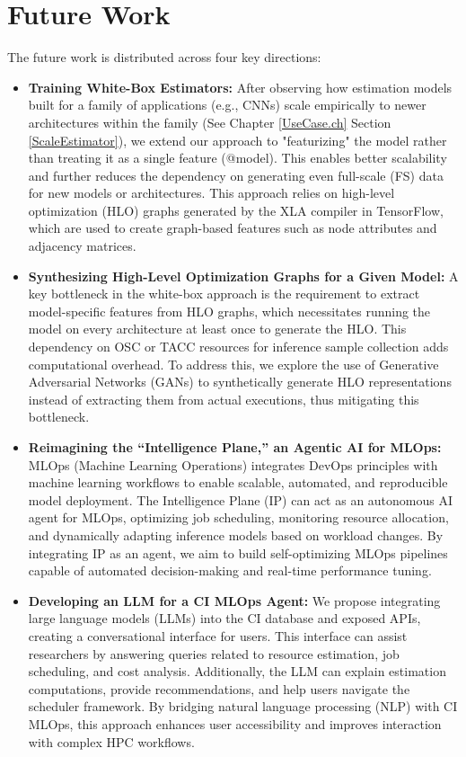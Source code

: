 \chapter{Future Work}
\label{FutureWork.ch}


The future work is distributed across four key directions:

\begin{itemize}
    \item \textbf{Training White-Box Estimators:}  
    After observing how estimation models built for a family of applications (e.g., CNNs) scale empirically to newer architectures within the family (See Chapter \ref{UseCase.ch} Section \ref{ScaleEstimator}), we extend our approach to "featurizing" the model rather than treating it as a single feature (@model). This enables better scalability and further reduces the dependency on generating even full-scale (FS) data for new models or architectures. This approach relies on high-level optimization (HLO) graphs generated by the XLA compiler in TensorFlow, which are used to create graph-based features such as node attributes and adjacency matrices.

    \item \textbf{Synthesizing High-Level Optimization Graphs for a Given Model:}  
    A key bottleneck in the white-box approach is the requirement to extract model-specific features from HLO graphs, which necessitates running the model on every architecture at least once to generate the HLO. This dependency on OSC or TACC resources for inference sample collection adds computational overhead. To address this, we explore the use of Generative Adversarial Networks (GANs) to synthetically generate HLO representations instead of extracting them from actual executions, thus mitigating this bottleneck.

    \item \textbf{Reimagining the “Intelligence Plane,” an Agentic AI for MLOps:}  
    MLOps (Machine Learning Operations) integrates DevOps principles with machine learning workflows to enable scalable, automated, and reproducible model deployment. The Intelligence Plane (IP) can act as an autonomous AI agent for MLOps, optimizing job scheduling, monitoring resource allocation, and dynamically adapting inference models based on workload changes. By integrating IP as an agent, we aim to build self-optimizing MLOps pipelines capable of automated decision-making and real-time performance tuning.

    \item \textbf{Developing an LLM for a CI MLOps Agent:}  
    We propose integrating large language models (LLMs) into the CI database and exposed APIs, creating a conversational interface for users. This interface can assist researchers by answering queries related to resource estimation, job scheduling, and cost analysis. Additionally, the LLM can explain estimation computations, provide recommendations, and help users navigate the scheduler framework. By bridging natural language processing (NLP) with CI MLOps, this approach enhances user accessibility and improves interaction with complex HPC workflows.
\end{itemize}

